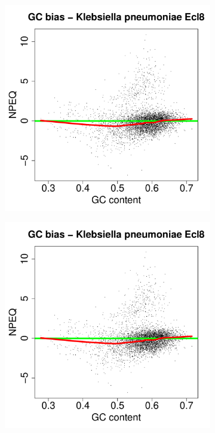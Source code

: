 \documentclass[12pt,letterpaper]{article}
\begin{document}
\begin{figure}
\captionsetup[subfigure]{justification=centering}
\begin{subfigure}{.49\textwidth}
  \centering
  \includegraphics[page=6, scale=0.25]{biases.pdf}
  \caption{}
  \label{fig:distance-bias}
\end{subfigure}
\begin{subfigure}{.49\textwidth}
  \centering
  \includegraphics[page=5, scale=0.25]{biases.pdf}

\end{subfigure}
\end{figure}
\end{document}
